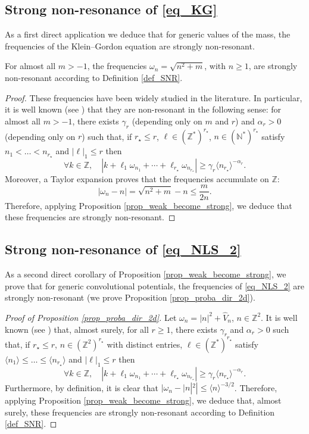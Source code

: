 \subsection{Strong non-resonance of \eqref{eq_KG}}
As a first direct application we deduce that for generic values of the mass, the frequencies of the Klein--Gordon equation are strongly non-resonant.
\begin{lemma} \label{lem_nr_KG} For almost all $m>-1$, the frequencies $\omega_n = \sqrt{n^2+m}$, with $n\geq 1$, are strongly non-resonant according to Definition \ref{def_SNR}.
\end{lemma}
\begin{proof}
These frequencies have been widely studied in the literature. In particular, it is well known (see \eg \cite{Bam03,Del09}) that they are non-resonant in the following sense: for almost all $m>-1$, there exists $\gamma_r$ (depending only on $m$ and $r$) and $\alpha_r>0$ (depending only on $r$) such that, if $r_\star \leq r$, $\ell \in (\mathbb{Z}^*)^{r_\star}$, $n \in (\mathbb{N}^*)^{r_\star}$ satisfy $ n_1 < \dots < n_{r_\star} $ and $|\ell|_1 \leq r$ then
\[
\forall k\in \mathbb{Z}, \quad |k+\ell_1 \omega_{n_1}+\cdots+ \ell_{r_\star} \omega_{n_{r_\star}} | \geq \gamma_r \langle n_{r_\star} \rangle^{-\alpha_r}.
\]
Moreover, a Taylor expansion proves that the frequencies accumulate on $\mathbb{Z}$:
\[
|\omega_n - n| = \sqrt{n^2+m} - n \leq \frac{m}{2n}.
\]
Therefore, applying Proposition \ref{prop_weak_become_strong}, we deduce that these frequencies are strongly non-resonant.
\end{proof}

\subsection{Strong non-resonance of \eqref{eq_NLS_2}} As a second direct corollary of Proposition \ref{prop_weak_become_strong}, we prove that for generic convolutional potentials, the frequencies of \eqref{eq_NLS_2} are strongly non-resonant (\ie we prove Proposition \ref{prop_proba_dir_2d}).

\begin{proof}[Proof of Proposition \ref{prop_proba_dir_2d}] Let $\omega_n = |n|^2 + \widehat{V}_n$, $n\in\mathbb{Z}^2$. It is well known (see \eg \cite[Th.\,3.22]{BG06}) that, almost surely, for all $r\geq 1$, there exists $\gamma_r$ and $\alpha_r>0$ such that, if $r_\star \leq r$, $n \in (\mathbb{Z}^2)^{r_\star}$ with distinct entries, $\ell \in (\mathbb{Z}^*)^{r_\star}$ satisfy $ \langle n_1 \rangle \leq \dots \leq \langle n_{r_\star} \rangle $ and $|\ell|_1 \leq r$ then
\[
\forall k\in \mathbb{Z}, \quad |k+\ell_1 \omega_{n_1}+\cdots+ \ell_{r_\star} \omega_{n_{r_\star}} | \geq \gamma_r \langle n_{r_\star} \rangle^{-\alpha_r}.
\]
Furthermore, by definition, it is clear that $
|\omega_n - |n|^2| \leq \langle n \rangle^{-3/2}$. Therefore, applying Proposition \ref{prop_weak_become_strong}, we deduce that, almost surely, these frequencies are strongly non-resonant according to Definition \ref{def_SNR}.
\end{proof}

